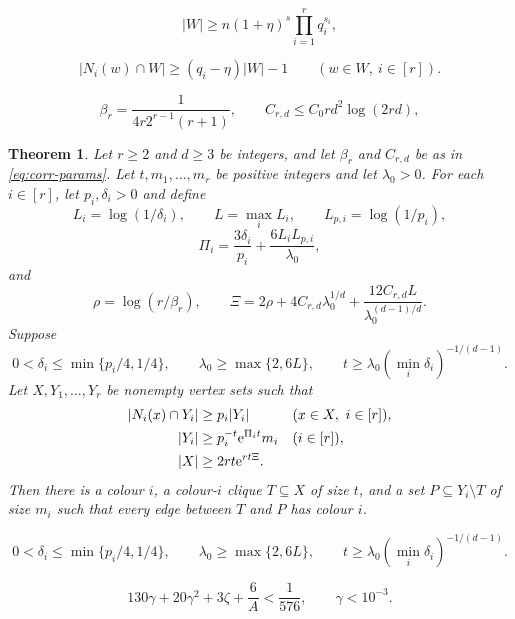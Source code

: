 \documentclass[10pt,a4paper]{amsart}
\newtheorem{theorem}{Theorem}
\newcommand{\e}{\mathrm e}
\begin{document}
\begin{equation}
 |W|\ge n(1+\eta)^s\prod_{i=1}^r q_i^{s_i},
\end{equation}

\begin{equation}
 |N_i(w)\cap W|\ge(q_i-\eta)|W|-1
 \qquad(w\in W,\ i\in[r]).
\end{equation}

\begin{equation}\label{eq:corr-params}
 \beta_r=\frac1{4r2^{r-1}(r+1)},
 \qquad C_{r,d}\le C_0rd^2\log(2rd),
\end{equation}

\begin{theorem}\label{thm:book}
Let $r\ge2$ and $d\ge3$ be integers, and let $\beta_r$ and $C_{r,d}$ be as in
\eqref{eq:corr-params}.  Let $t,m_1,\ldots,m_r$ be positive integers and let
$\lambda_0>0$.  For each
$i\in[r]$, let $p_i,\delta_i>0$ and define
\[
 L_i=\log(1/\delta_i),\qquad L=\max_iL_i,
 \qquad L_{p,i}=\log(1/p_i),
\]
\[
 \Pi_i=\frac{3\delta_i}{p_i}
       +\frac{6L_iL_{p,i}}{\lambda_0},
\]
and
\[
 \rho=\log(r/\beta_r),\qquad
 \Xi=2\rho+4C_{r,d}\lambda_0^{1/d}
      +\frac{12C_{r,d}L}{\lambda_0^{(d-1)/d}}.
\]
Suppose
\begin{equation}\label{eq:book-parameters}
 0<\delta_i\le\min\{p_i/4,1/4\},
 \qquad
 \lambda_0\ge\max\{2,6L\},
 \qquad
 t\ge\lambda_0(\min_i\delta_i)^{-1/(d-1)}.
\end{equation}
Let $X,Y_1,\ldots,Y_r$ be nonempty vertex sets such that
\begin{align}
 |N_i(x)\cap Y_i|&\ge p_i|Y_i|
 &&(x\in X,\ i\in[r]),\notag\\
 |Y_i|&\ge p_i^{-t}\e^{\Pi_it}m_i
 &&(i\in[r]),\notag\\
 |X|&\ge2rt\e^{rt\Xi}.\label{eq:book-reservoir}
\end{align}
Then there is a colour $i$, a colour-$i$ clique $T\subseteq X$ of size $t$,
and a set $P\subseteq Y_i\setminus T$ of size $m_i$ such that every edge
between $T$ and $P$ has colour $i$.
\end{theorem}

\begin{equation}
 0<\delta_i\le\min\{p_i/4,1/4\},
 \qquad
 \lambda_0\ge\max\{2,6L\},
 \qquad
 t\ge\lambda_0(\min_i\delta_i)^{-1/(d-1)}.
\end{equation}

\begin{equation}\label{eq:constant-choice}
 130\gamma+20\gamma^2+3\zeta+\frac6A<\frac1{576},
 \qquad \gamma<10^{-3}.
\end{equation}
\end{document}
